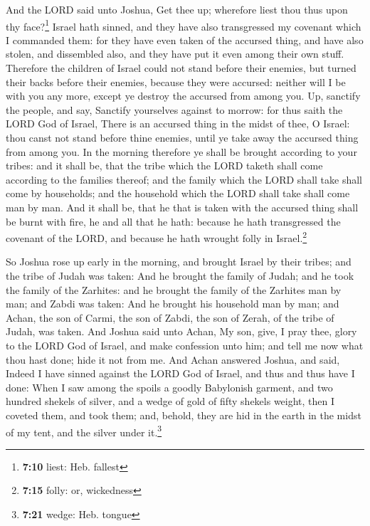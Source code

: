  And the LORD said unto Joshua, Get thee up; wherefore
liest thou thus upon thy face?\footnote{\textbf{7:10} liest: Heb.
  fallest}  Israel hath sinned, and they have also
transgressed my covenant which I commanded them: for they have even
taken of the accursed thing, and have also stolen, and dissembled also,
and they have put it even among their own stuff. 
Therefore the children of Israel could not stand before their enemies,
but turned their backs before their enemies, because they were accursed:
neither will I be with you any more, except ye destroy the accursed from
among you.  Up, sanctify the people, and say, Sanctify
yourselves against to morrow: for thus saith the LORD God of Israel,
There is an accursed thing in the midst of thee, O Israel: thou canst
not stand before thine enemies, until ye take away the accursed thing
from among you.  In the morning therefore ye shall be
brought according to your tribes: and it shall be, that the tribe which
the LORD taketh shall come according to the families thereof; and the
family which the LORD shall take shall come by households; and the
household which the LORD shall take shall come man by man.
 And it shall be, that he that is taken with the accursed
thing shall be burnt with fire, he and all that he hath: because he hath
transgressed the covenant of the LORD, and because he hath wrought folly
in Israel.\footnote{\textbf{7:15} folly: or, wickedness}

 So Joshua rose up early in the morning, and brought
Israel by their tribes; and the tribe of Judah was taken:
 And he brought the family of Judah; and he took the
family of the Zarhites: and he brought the family of the Zarhites man by
man; and Zabdi was taken:  And he brought his household
man by man; and Achan, the son of Carmi, the son of Zabdi, the son of
Zerah, of the tribe of Judah, was taken.  And Joshua said
unto Achan, My son, give, I pray thee, glory to the LORD God of Israel,
and make confession unto him; and tell me now what thou hast done; hide
it not from me.  And Achan answered Joshua, and said,
Indeed I have sinned against the LORD God of Israel, and thus and thus
have I done:  When I saw among the spoils a goodly
Babylonish garment, and two hundred shekels of silver, and a wedge of
gold of fifty shekels weight, then I coveted them, and took them; and,
behold, they are hid in the earth in the midst of my tent, and the
silver under it.\footnote{\textbf{7:21} wedge: Heb. tongue}


